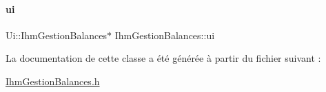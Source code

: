 \paragraph{\texorpdfstring{ui}{ui}}
{\footnotesize\ttfamily Ui\+::\+Ihm\+Gestion\+Balances$\ast$ Ihm\+Gestion\+Balances\+::ui\hspace{0.3cm}{\ttfamily [private]}}



La documentation de cette classe a été générée à partir du fichier suivant \+:\begin{DoxyCompactItemize}
\item 
\hyperlink{_ihm_gestion_balances_8h}{Ihm\+Gestion\+Balances.\+h}\end{DoxyCompactItemize}
